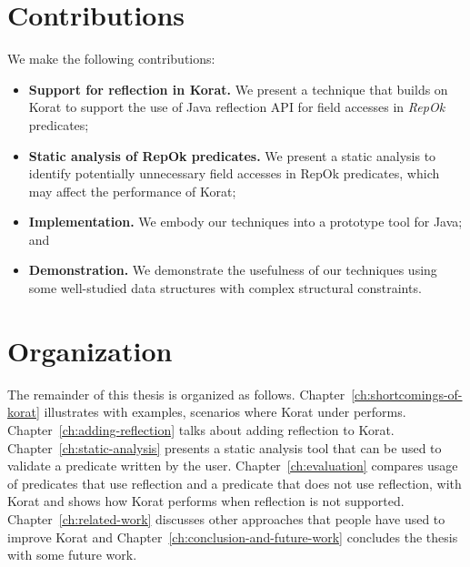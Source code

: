 \section{Contributions}
\label{sec:contributions}
\noindent We make the following contributions:

\begin{itemize}
\item {\bf Support for reflection in Korat.}  We present a technique
  that builds on Korat to support the use of Java reflection API for
  field accesses in \emph{RepOk} predicates;
\item {\bf Static analysis of RepOk predicates.} We present a static
  analysis to identify potentially unnecessary field accesses in RepOk
  predicates, which may affect the performance of Korat;
\item {\bf Implementation.} We embody our techniques into a prototype
  tool for Java; and
\item {\bf Demonstration.} We demonstrate the usefulness of our
  techniques using some well-studied data structures with complex
  structural constraints.
\end{itemize}

\section{Organization}
\label{sec:organization-of-thesis}
The remainder of this thesis is organized as follows. Chapter~\ref{ch:shortcomings-of-korat} illustrates with examples, scenarios where Korat under performs. Chapter~\ref{ch:adding-reflection} talks about adding reflection to Korat. Chapter~\ref{ch:static-analysis} presents a static analysis tool that can be used to validate a predicate written by the user. Chapter~\ref{ch:evaluation} compares usage of predicates that use reflection and a predicate that does not use reflection, with Korat and shows how Korat performs when reflection is not supported. Chapter~\ref{ch:related-work} discusses other approaches that people have used to improve Korat and Chapter~\ref{ch:conclusion-and-future-work} concludes the thesis with some future work.

